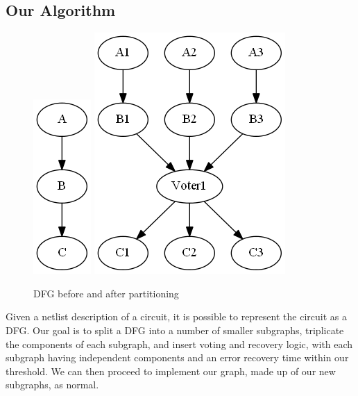 \documentclass[12pt,drafta4paper,oneside]{memoir} %
\begin{document}
\subsection{Our Algorithm}\label{Algorithm}
\begin{figure}
    \begin{center}
        \includegraphics[height=0.2\textheight]{images/TMR-graph.png}
        \includegraphics[height=0.2\textheight]{images/TMR-post.png}
        \caption{\ac{DFG} before and after partitioning}
        \label{TMRFigure}
    \end{center}
\end{figure}
Given a netlist description of a circuit, it is possible to represent the circuit as a \ac{DFG}\cite{FPGAArch}. Our goal is to split a \ac{DFG} into a number of smaller subgraphs, triplicate the components of each subgraph, and insert voting and recovery logic, with each subgraph having independent components and an error recovery time within our threshold. We can then proceed to implement our graph, made up of our new subgraphs, as normal.
\end{document}
